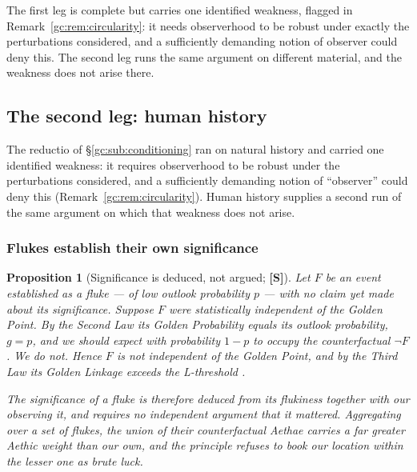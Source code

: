 \documentclass[11pt]{article}
\numberwithin{equation}{section}
\theoremstyle{plain}
\newtheorem{proposition}[theorem]{Proposition}
\theoremstyle{definition}
\theoremstyle{remark}
\begin{document}
The first leg is complete but carries one identified weakness, flagged
in Remark~\ref{gc:rem:circularity}: it needs observerhood to be robust
under exactly the perturbations considered, and a sufficiently demanding
notion of observer could deny this. The second leg runs the same
argument on different material, and the weakness does not arise there.

\subsection{The second leg: human history}\label{gc:sub:humanhistory}

The reductio of \S\ref{gc:sub:conditioning} ran on natural history and
carried one identified weakness: it requires observerhood to be robust
under the perturbations considered, and a sufficiently demanding notion
of ``observer'' could deny this
(Remark~\ref{gc:rem:circularity}). Human history supplies a second run
of the same argument on which that weakness does not arise.

\subsubsection{Flukes establish their own significance}
\label{gc:subsub:flukes}

\begin{proposition}[Significance is deduced, not argued; \textbf{[S]}]
\label{gc:prop:flukes}
Let $F$ be an event established as a \emph{fluke} --- of low outlook
probability $p$ --- with no claim yet made about its significance.
Suppose $F$ were statistically independent of the Golden Point. By the
Second Law its Golden Probability equals its outlook probability, $g=p$,
and we should expect with probability $1-p$ to occupy the counterfactual
$\neg F$. We do not. Hence $F$ is not independent of the Golden Point,
and by the Third Law its Golden Linkage exceeds the L-threshold
\cite{Nexus, GoldenScience22}.

The significance of a fluke is therefore \emph{deduced from its
flukiness together with our observing it}, and requires no independent
argument that it mattered. Aggregating over a set of flukes, the union
of their counterfactual Aethae carries a far greater Aethic weight than
our own, and the principle refuses to book our location within the
lesser one as brute luck.
\end{proposition}
\end{document}
